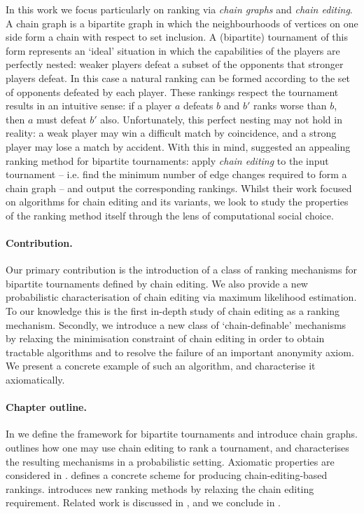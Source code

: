 In this work we focus particularly on ranking via \emph{chain graphs} and
\emph{chain editing}. A chain graph is a bipartite graph in which the
neighbourhoods of vertices on one side form a chain with respect to set
inclusion. A (bipartite) tournament of this form represents an `ideal'
situation in which the capabilities of the players are perfectly nested: weaker
players defeat a subset of the opponents that stronger players defeat. In this
case a natural ranking can be formed according to the set of opponents defeated
by each player. These rankings respect the tournament results in an intuitive
sense: if a player $a$ defeats $b$ and $b'$ ranks worse than $b$, then $a$ must
defeat $b'$ also.
%
Unfortunately, this perfect nesting may not hold in reality: a weak player may
win a difficult match by coincidence, and a strong player may lose a match by
accident.
%
With this in mind, \textcite{jiao2017algorithms} suggested an appealing ranking
method for bipartite tournaments: apply \emph{chain editing} to the input
tournament -- i.e. find the minimum number of edge changes required to form a
chain graph -- and output the corresponding rankings. Whilst their work
focused on algorithms for chain editing and its variants, we look to study the
properties of the ranking method itself through the lens of computational social
choice.

\paragraph{Contribution.} Our primary contribution is the introduction of a
class of ranking mechanisms for bipartite tournaments defined by chain editing.
We also provide a new probabilistic characterisation of chain editing via
maximum likelihood estimation. To our knowledge this is the first in-depth
study of chain editing as a ranking mechanism. Secondly, we introduce a new
class of `chain-definable' mechanisms by relaxing the minimisation constraint
of chain editing in order to obtain tractable algorithms and to resolve the
failure of an important anonymity axiom. We present a concrete example of such
an algorithm, and characterise it axiomatically.

\paragraph{Chapter outline.} In  we define the
framework for bipartite tournaments and introduce chain graphs.
 outlines how one may use chain editing to
rank a tournament, and characterises the resulting mechanisms in a
probabilistic setting. Axiomatic properties are considered in
.  defines a
concrete scheme for producing chain-editing-based rankings.
 introduces new ranking methods by relaxing the
chain editing requirement. Related work is discussed in
, and we conclude in .

